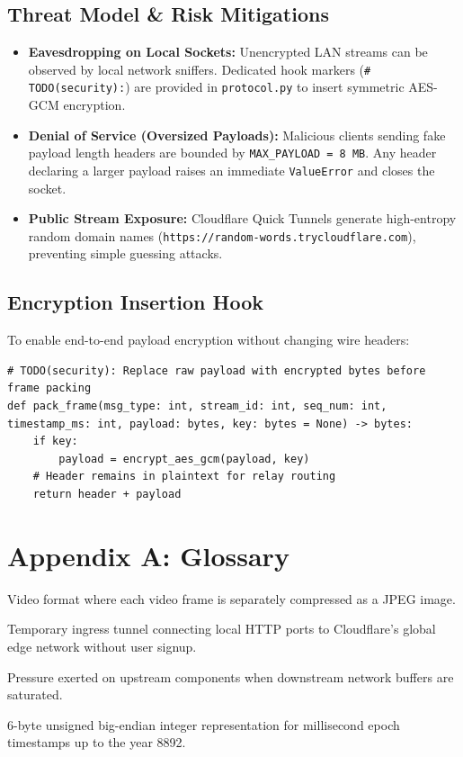 \documentclass[11pt,a4paper]{article}
\begin{document}
\subsection{Threat Model \& Risk Mitigations}
\begin{itemize}[noitemsep]
    \item \textbf{Eavesdropping on Local Sockets:} Unencrypted LAN streams can be observed by local network sniffers. Dedicated hook markers (\texttt{\# TODO(security):}) are provided in \texttt{protocol.py} to insert symmetric AES-GCM encryption.
    \item \textbf{Denial of Service (Oversized Payloads):} Malicious clients sending fake payload length headers are bounded by \texttt{MAX\_PAYLOAD = 8 MB}. Any header declaring a larger payload raises an immediate \texttt{ValueError} and closes the socket.
    \item \textbf{Public Stream Exposure:} Cloudflare Quick Tunnels generate high-entropy random domain names (\texttt{https://random-words.trycloudflare.com}), preventing simple guessing attacks.
\end{itemize}

\subsection{Encryption Insertion Hook}
To enable end-to-end payload encryption without changing wire headers:
\begin{lstlisting}[caption={AES Encryption insertion point in protocol.py}]
# TODO(security): Replace raw payload with encrypted bytes before frame packing
def pack_frame(msg_type: int, stream_id: int, seq_num: int, timestamp_ms: int, payload: bytes, key: bytes = None) -> bytes:
    if key:
        payload = encrypt_aes_gcm(payload, key)
    # Header remains in plaintext for relay routing
    return header + payload
\end{lstlisting}

\newpage

\appendix
\section{Appendix A: Glossary}

\begin{description}[style=nextline]
    \item[\textbf{MJPEG (Motion JPEG)}] Video format where each video frame is separately compressed as a JPEG image.
    \item[\textbf{Cloudflare Quick Tunnel}] Temporary ingress tunnel connecting local HTTP ports to Cloudflare's global edge network without user signup.
    \item[\textbf{Backpressure}] Pressure exerted on upstream components when downstream network buffers are saturated.
    \item[\textbf{uint48}] 6-byte unsigned big-endian integer representation for millisecond epoch timestamps up to the year 8892.
\end{description}
\end{document}
